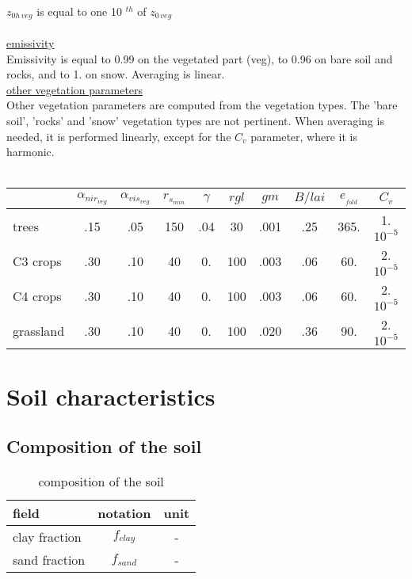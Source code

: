  $z_{0h\, veg}$ is equal to one  10 $^{th}$ of $z_{0\, veg}$\\
 \medskip\\
 \underline{ emissivity}\\
 Emissivity is equal to 0.99 on the vegetated part (veg),
 to 0.96 on bare soil and rocks, and to 1. on snow.
 Averaging is linear.
 \medskip\\
 \underline{ other vegetation parameters}\\
 Other vegetation parameters are computed from the vegetation types.
 The 'bare soil', 'rocks' and 'snow' vegetation types are not pertinent.
 When averaging is needed,
 it is performed linearly, except for the $C_v$ parameter, where it is harmonic.\\
 \medskip\\
 \begin{tabular}{||l||c|c|c|c|c|c|c|c|c||}
 \hline
 &$\alpha_{{nir}_{veg}}$&$\alpha_{{vis}_{veg}}$&$r_{s_{min}}$&$\gamma$&$rgl$&$gm$&$B/lai$&$e_{_{fold}}$&$C_v$
\\
 \hline
 trees      & .15 & .05 & 150 & .04 & 30 & .001 & .25 & 365. & 1. $10^{-5}$ \\
 C3 crops   & .30 & .10 &  40 & 0. & 100 & .003 & .06 &  60. & 2. $10^{-5}$ \\
 C4 crops   & .30 & .10 &  40 & 0. & 100 & .003 & .06 &  60. & 2. $10^{-5}$ \\
 grassland  & .30 & .10 &  40 & 0. & 100 & .020 & .36 &  90. & 2. $10^{-5}$ \\
 \hline
 \end{tabular}


\newpage
\section{Soil characteristics}

\subsection{Composition of the soil}

\begin{table}[h]
\hspace*{4.cm}
\begin{tabular}{||l|c|c||}
\hline
\hline
field & notation &  unit \\
\hline
\hline
clay fraction & $f_{clay}$ &- \\
sand fraction & $f_{sand}$ &- \\
\hline
\hline
\end{tabular}
\caption{composition of the soil
\label{paramSOIL}}
\end{table}

